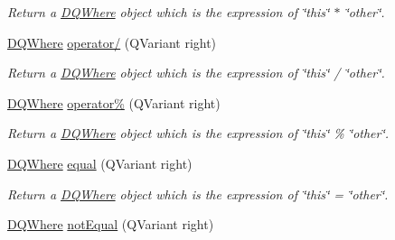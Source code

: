 \begin{DoxyCompactItemize}
\begin{DoxyCompactList}\small\item\em Return a \hyperlink{classDQWhere}{DQWhere} object which is the expression of \char`\"{}this\char`\"{} $\ast$ \char`\"{}other\char`\"{}. \item\end{DoxyCompactList}\item 
\hypertarget{classDQWhere_a9db082bc9592711355d63b505e99c367}{
\hyperlink{classDQWhere}{DQWhere} \hyperlink{classDQWhere_a9db082bc9592711355d63b505e99c367}{operator/} (QVariant right)}
\label{classDQWhere_a9db082bc9592711355d63b505e99c367}

\begin{DoxyCompactList}\small\item\em Return a \hyperlink{classDQWhere}{DQWhere} object which is the expression of \char`\"{}this\char`\"{} / \char`\"{}other\char`\"{}. \item\end{DoxyCompactList}\item 
\hypertarget{classDQWhere_a0e5f33208768c05e9ee5439d2ac34c2f}{
\hyperlink{classDQWhere}{DQWhere} \hyperlink{classDQWhere_a0e5f33208768c05e9ee5439d2ac34c2f}{operator\%} (QVariant right)}
\label{classDQWhere_a0e5f33208768c05e9ee5439d2ac34c2f}

\begin{DoxyCompactList}\small\item\em Return a \hyperlink{classDQWhere}{DQWhere} object which is the expression of \char`\"{}this\char`\"{} \% \char`\"{}other\char`\"{}. \item\end{DoxyCompactList}\item 
\hypertarget{classDQWhere_a4ff1ffec2e0491ab3e6b10662134a6f7}{
\hyperlink{classDQWhere}{DQWhere} \hyperlink{classDQWhere_a4ff1ffec2e0491ab3e6b10662134a6f7}{equal} (QVariant right)}
\label{classDQWhere_a4ff1ffec2e0491ab3e6b10662134a6f7}

\begin{DoxyCompactList}\small\item\em Return a \hyperlink{classDQWhere}{DQWhere} object which is the expression of \char`\"{}this\char`\"{} = \char`\"{}other\char`\"{}. \item\end{DoxyCompactList}\item 
\hypertarget{classDQWhere_aebe7fd81605327a3d9852e29891b2bd7}{
\hyperlink{classDQWhere}{DQWhere} \hyperlink{classDQWhere_aebe7fd81605327a3d9852e29891b2bd7}{notEqual} (QVariant right)}
\label{classDQWhere_aebe7fd81605327a3d9852e29891b2bd7}


\end{DoxyCompactItemize}
